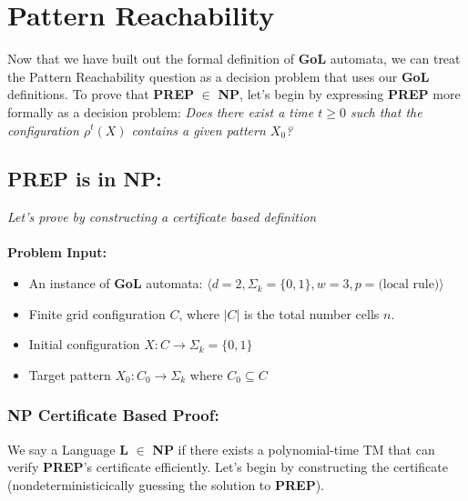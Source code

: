 \documentclass{article}
\theoremstyle{definition}
\theoremstyle{plain}
\theoremstyle{plain}
\begin{document}
\section{Pattern Reachability}
Now that we have built out the formal definition of \textbf{GoL} automata, we can treat the Pattern Reachability question as a decision problem that uses our \textbf{GoL} definitions. To prove that \textbf{PREP} $\in$ \textbf{NP}, let's begin by expressing \textbf{PREP} more formally as a decision problem: \textit{Does there exist a time $t \geq 0$ such that the configuration $\rho^t(X)$ contains a given pattern $X_0$?}

\subsection{PREP is in NP:}

\label{NP_proof}
\textit{Let's prove by constructing a certificate based definition}\\
\\
\textbf{Problem Input:}
\begin{itemize}
  \item An instance of \textbf{GoL} automata: $ \langle d = 2, \Sigma_k = \{0,1\}, w = 3, p = \text{(local rule)} \rangle$
    \item Finite grid configuration $ C$, where $ |C| $ is the total number cells $n$.
  \item Initial configuration $ X: C \to \Sigma_k = \{0,1\}$ 
    \item Target pattern $ X_0: C_0 \to \Sigma_k $ where \( C_0 \subseteq C \)
\end{itemize}

\subsubsection{NP Certificate Based Proof:\cite{SUTNER199587}}
We say a  Language \textbf{L} $\in$ \textbf{NP} if there exists a polynomial-time TM that can verify \textbf{PREP}'s certificate efficiently. Let's begin by constructing the certificate (nondeterministicically guessing the solution to \textbf{PREP}).
\end{document}
